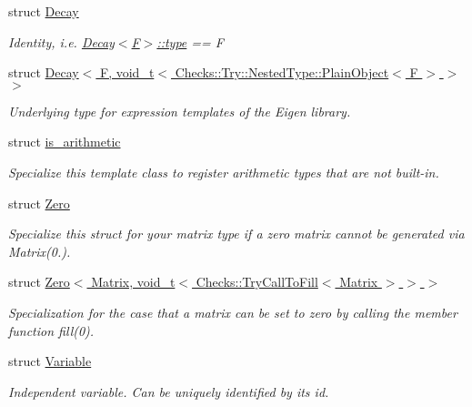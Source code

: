 \begin{DoxyCompactItemize}
struct \hyperlink{structFunG_1_1Decay}{Decay}
\begin{DoxyCompactList}\small\item\em Identity, i.\-e. \hyperlink{structFunG_1_1Decay_a4b2916cbb7c8587ab3fccc9b896b9df4}{Decay$<$\-F$>$\-::type} == F \end{DoxyCompactList}\item 
struct \hyperlink{structFunG_1_1Decay_3_01F_00_01void__t_3_01Checks_1_1Try_1_1NestedType_1_1PlainObject_3_01F_01_4_01_4_01_4}{Decay$<$ F, void\-\_\-t$<$ Checks\-::\-Try\-::\-Nested\-Type\-::\-Plain\-Object$<$ F $>$ $>$ $>$}
\begin{DoxyCompactList}\small\item\em Underlying type for expression templates of the Eigen library. \end{DoxyCompactList}\item 
struct \hyperlink{structFunG_1_1is__arithmetic}{is\-\_\-arithmetic}
\begin{DoxyCompactList}\small\item\em Specialize this template class to register arithmetic types that are not built-\/in. \end{DoxyCompactList}\item 
struct \hyperlink{structFunG_1_1Zero}{Zero}
\begin{DoxyCompactList}\small\item\em Specialize this struct for your matrix type if a zero matrix cannot be generated via Matrix(0.). \end{DoxyCompactList}\item 
struct \hyperlink{structFunG_1_1Zero_3_01Matrix_00_01void__t_3_01Checks_1_1TryCallToFill_3_01Matrix_01_4_01_4_01_4}{Zero$<$ Matrix, void\-\_\-t$<$ Checks\-::\-Try\-Call\-To\-Fill$<$ Matrix $>$ $>$ $>$}
\begin{DoxyCompactList}\small\item\em Specialization for the case that a matrix can be set to zero by calling the member function fill(0). \end{DoxyCompactList}\item 
struct \hyperlink{structFunG_1_1Variable}{Variable}
\begin{DoxyCompactList}\small\item\em Independent variable. Can be uniquely identified by its id. \end{DoxyCompactList}\end{DoxyCompactItemize}

